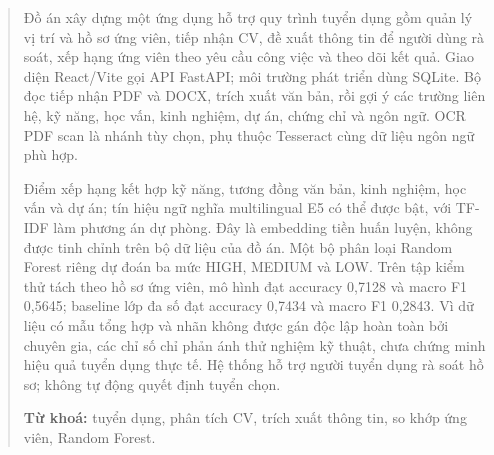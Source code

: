 \begin{abstract}

Đồ án xây dựng một ứng dụng hỗ trợ quy trình tuyển dụng gồm quản lý vị trí và hồ sơ ứng viên, tiếp nhận CV, đề xuất thông tin để người dùng rà soát, xếp hạng ứng viên theo yêu cầu công việc và theo dõi kết quả. Giao diện React/Vite gọi API FastAPI; môi trường phát triển dùng SQLite. Bộ đọc tiếp nhận PDF và DOCX, trích xuất văn bản, rồi gợi ý các trường liên hệ, kỹ năng, học vấn, kinh nghiệm, dự án, chứng chỉ và ngôn ngữ. OCR PDF scan là nhánh tùy chọn, phụ thuộc Tesseract cùng dữ liệu ngôn ngữ phù hợp.

Điểm xếp hạng kết hợp kỹ năng, tương đồng văn bản, kinh nghiệm, học vấn và dự án; tín hiệu ngữ nghĩa multilingual E5 có thể được bật, với TF-IDF làm phương án dự phòng. Đây là embedding tiền huấn luyện, không được tinh chỉnh trên bộ dữ liệu của đồ án. Một bộ phân loại Random Forest riêng dự đoán ba mức HIGH, MEDIUM và LOW. Trên tập kiểm thử tách theo hồ sơ ứng viên, mô hình đạt accuracy 0,7128 và macro F1 0,5645; baseline lớp đa số đạt accuracy 0,7434 và macro F1 0,2843. Vì dữ liệu có mẫu tổng hợp và nhãn không được gán độc lập hoàn toàn bởi chuyên gia, các chỉ số chỉ phản ánh thử nghiệm kỹ thuật, chưa chứng minh hiệu quả tuyển dụng thực tế. Hệ thống hỗ trợ người tuyển dụng rà soát hồ sơ; không tự động quyết định tuyển chọn.

\vspace{0.8em}
\noindent\textbf{Từ khoá:} tuyển dụng, phân tích CV, trích xuất thông tin, so khớp ứng viên, Random Forest.

\end{abstract}

